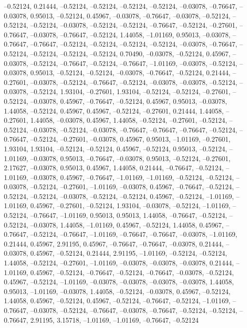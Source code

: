 \documentclass{article}
\begin{document}
{--0.52124, 0.21444, --0.52124, --0.52124, --0.52124, --0.52124,
--0.03078, --0.76647, --0.03078, 0.95013, --0.52124, 0.45967, --0.03078,
--0.76647, --0.03078, --0.52124, --0.52124, --0.52124, --0.03078,
--0.52124, --0.52124, --0.76647, --0.52124, --0.27601, --0.76647,
--0.03078, --0.76647, --0.52124, 1.44058, --1.01169, 0.95013, --0.03078,
--0.76647, --0.76647, --0.52124, --0.52124, --0.52124, --0.52124,
--0.03078, --0.76647, --0.52124, --0.52124, --0.52124, --0.52124,
0.70490, --0.03078, --0.52124, 0.45967, --0.03078, --0.52124, --0.76647,
--0.52124, --0.76647, --1.01169, --0.03078, --0.52124, --0.03078,
0.95013, --0.52124, --0.52124, --0.03078, --0.76647, --0.52124, 0.21444,
--0.27601, --0.03078, --0.52124, --0.76647, --0.52124, --0.03078,
--0.03078, --0.52124, --0.03078, --0.52124, 1.93104, --0.27601, 1.93104,
--0.52124, --0.52124, --0.27601, --0.52124, --0.03078, 0.45967,
--0.76647, --0.52124, 0.45967, 0.95013, --0.03078, 1.44058, --0.52124,
0.45967, 0.45967, --0.52124, --0.27601, 0.21444, 1.44058, --0.27601,
1.44058, --0.03078, 0.45967, 1.44058, --0.52124, --0.27601, --0.52124,
--0.52124, --0.03078, --0.52124, --0.03078, --0.76647, --0.76647,
--0.76647, --0.52124, --0.76647, --0.52124, --0.27601, --0.03078,
0.45967, 0.95013, --1.01169, --0.27601, 1.93104, 1.93104, --0.52124,
--0.52124, 0.45967, --0.52124, 0.95013, --0.52124, --1.01169, --0.03078,
0.95013, --0.76647, --0.03078, 0.95013, --0.52124, --0.27601, 2.17627,
--0.03078, 0.95013, 0.45967, 1.44058, 0.21444, --0.76647, --0.52124,
--1.01169, --0.03078, 0.45967, --0.76647, --1.01169, --1.01169,
--0.52124, --0.52124, --0.03078, --0.52124, --0.27601, --1.01169,
--0.03078, 0.45967, --0.76647, --0.52124, --0.52124, --0.52124,
--0.03078, --0.52124, --0.52124, 0.45967, --0.52124, --1.01169,
--1.01169, 0.45967, --0.27601, --0.52124, 1.93104, --0.03078, --0.52124,
--1.01169, --0.52124, --0.76647, --1.01169, 0.95013, 0.95013, 1.44058,
--0.76647, --0.52124, --0.52124, --0.03078, 1.44058, --1.01169, 0.45967,
--0.52124, 1.44058, 0.45967, --0.76647, --0.52124, --0.76647, --1.01169,
--0.76647, --0.76647, --0.03078, --1.01169, 0.21444, 0.45967, 2.91195,
0.45967, --0.76647, --0.76647, --0.03078, 0.21444, --0.03078, 0.45967,
--0.52124, 0.21444, 2.91195, --1.01169, --0.52124, --0.52124, 1.44058,
--0.52124, --0.27601, --1.01169, --0.03078, --0.03078, --0.03078,
0.21444, --1.01169, 0.45967, --0.52124, --0.76647, --0.52124, --0.76647,
--0.03078, --0.52124, 0.45967, --0.52124, --1.01169, --0.03078,
--0.03078, --0.03078, --0.03078, 1.44058, 0.95013, --1.01169, --0.03078,
1.44058, --0.52124, --0.03078, 0.45967, --0.52124, 1.44058, 0.45967,
--0.52124, 0.45967, --0.52124, --0.76647, --0.52124, --1.01169,
--0.76647, --0.03078, --0.52124, --0.76647, --0.03078, --0.76647,
--0.52124, --0.52124, --0.76647, 2.91195, 3.15718, --1.01169, --1.01169,
--0.76647, --0.52124
\LL
}
\end{document}

